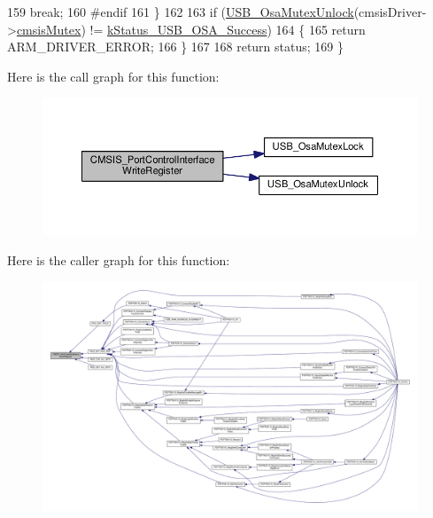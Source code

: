 \begin{DoxyCode}
159             \textcolor{keywordflow}{break};
160 \textcolor{preprocessor}{#endif
}
161 \textcolor{preprocessor}{}    \}
162 
163     \textcolor{keywordflow}{if} (\hyperlink{group__usb__os__abstraction_gaad3249273d566eae00e2cea81192315a}{USB\_OsaMutexUnlock}(cmsisDriver->\hyperlink{struct__cmsis__drier__adapter_a952d05d8262ef9aebfa6ca9c4d62fe46}{cmsisMutex}) != 
      \hyperlink{group__usb__os__abstraction_gga453ebd2f93aafb8c938c3a23c815f9bdab90805fb75297fda1ca60dbb2283f933}{kStatus\_USB\_OSA\_Success})
164     \{
165         \textcolor{keywordflow}{return} ARM\_DRIVER\_ERROR;
166     \}
167 
168     \textcolor{keywordflow}{return} status;
169 \}
\end{DoxyCode}


Here is the call graph for this function\-:
\nopagebreak
\begin{figure}[H]
\begin{center}
\leavevmode
\includegraphics[width=350pt]{group__usb__pd__cmsis__wrapper_ga09c1e56830b347c846c280fe3525c757_cgraph}
\end{center}
\end{figure}




Here is the caller graph for this function\-:
\nopagebreak
\begin{figure}[H]
\begin{center}
\leavevmode
\includegraphics[width=350pt]{group__usb__pd__cmsis__wrapper_ga09c1e56830b347c846c280fe3525c757_icgraph}
\end{center}
\end{figure}


